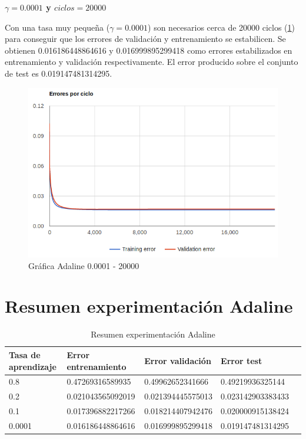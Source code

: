 \documentclass[11pt,spanish,listoffigures,listoftables]{tfgetsinf}
\begin{document}
\par \textbf{$\gamma = 0.0001$ y $ciclos = 20000$}

\par Con una tasa muy pequeña ($\gamma = 0.0001$) son necesarios cerca de 20000 ciclos (\ref{fig:000120000}) para conseguir que los errores de validación y entrenamiento se estabilicen. Se obtienen 0.016186448864616 y 0.016999895299418 como errores estabilizados en entrenamiento y validación respectivamente. El error producido sobre el conjunto de test es 0.019147481314295.

\begin{figure}[H]
\centering
\includegraphics[scale=0.5]{000120000}
\caption{Gráfica Adaline 0.0001 - 20000}\label{fig:000120000}
\end{figure}

\section{Resumen experimentación Adaline}

\begin{table}[H]
\centering
\caption{Resumen experimentación Adaline}
\label{tb:tb1}
\begin{tabular}{lllll}
\hline
\multicolumn{1}{|l|}{Tasa de aprendizaje} & Error entrenamiento & Error validación  & Error test        \\ \hline \hline
0.8                                       & 0.47269316589935    & 0.49962652341666  & 0.49219936325144  \\
0.2                                       & 0.021043565092019   & 0.021394445575013 & 0.023142903383433 \\
0.1                                       & 0.017396882217266   & 0.018214407942476 & 0.020000915138424 \\
0.0001                                    & 0.016186448864616   & 0.016999895299418 & 0.019147481314295 \\ \hline
\end{tabular}
\end{table}
\end{document}
